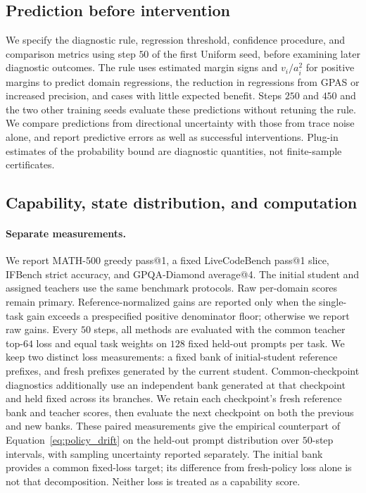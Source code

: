 \subsection{Prediction before intervention}

We specify the diagnostic rule, regression threshold, confidence procedure,
and comparison metrics using step $50$ of the first Uniform seed, before
examining later diagnostic outcomes. The rule uses estimated margin signs and
$v_i/a_i^2$ for positive margins to predict domain regressions, the reduction
in regressions from GPAS or increased precision, and cases with little expected
benefit. Steps $250$ and $450$ and the two other training seeds evaluate these
predictions without retuning the rule. We compare predictions from directional
uncertainty with those from trace noise alone, and report predictive errors
as well as successful interventions. Plug-in estimates of the probability
bound are diagnostic quantities, not finite-sample certificates.

\subsection{Capability, state distribution, and computation}

\paragraph{Separate measurements.}
We report MATH-500 greedy pass@1, a fixed LiveCodeBench pass@1 slice,
IFBench strict accuracy, and GPQA-Diamond average@4. The initial student and
assigned teachers use the same benchmark protocols. Raw per-domain scores
remain primary. Reference-normalized gains are reported only when the
single-task gain exceeds a prespecified positive denominator floor; otherwise
we report raw gains. Every $50$ steps, all methods are evaluated with the
common teacher top-$64$ loss and equal task weights on $128$ fixed held-out
prompts per task. We keep two distinct loss measurements: a fixed bank of
initial-student reference prefixes, and fresh prefixes generated by the
current student. Common-checkpoint diagnostics additionally use an independent
bank generated at that checkpoint and held fixed across its branches.
We retain each checkpoint's fresh reference bank and teacher scores, then
evaluate the next checkpoint on both the previous and new banks. These paired
measurements give the empirical counterpart of Equation~\ref{eq:policy_drift}
on the held-out prompt distribution over $50$-step intervals, with sampling
uncertainty reported separately. The initial bank provides a common fixed-loss target;
its difference from fresh-policy loss alone is not that decomposition.
Neither loss is treated as a capability score.

